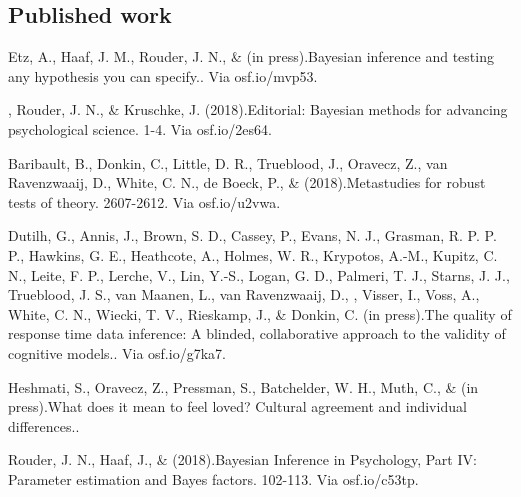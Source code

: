 

\subsection*{Published work}\srefs
\item[51.] Etz, A., Haaf, J. M., Rouder, J. N., \& \vdkh{} (in press).\newblock Bayesian inference and testing any hypothesis you can specify.. Via osf.io/mvp53.%

\item[50.] \vdkh{}, Rouder, J. N., \& Kruschke, J. (2018).\newblock Editorial: Bayesian methods for advancing psychological science. 1-4. Via osf.io/2es64.%

\item[49.] Baribault, B., Donkin, C., Little, D. R., Trueblood, J., Oravecz, Z., van Ravenzwaaij, D., White, C. N., de Boeck, P., \& \vdkh{} (2018).\newblock Metastudies for robust tests of theory. 2607-2612. Via osf.io/u2vwa.%

\item[48.] Dutilh, G., Annis, J., Brown, S. D., Cassey, P., Evans, N. J., Grasman, R. P. P. P., Hawkins, G. E., Heathcote, A., Holmes, W. R., Krypotos, A.-M., Kupitz, C. N., Leite, F. P., Lerche, V., Lin, Y.-S., Logan, G. D., Palmeri, T. J., Starns, J. J., Trueblood, J. S., van Maanen, L., van Ravenzwaaij, D., \vdkh{}, Visser, I., Voss, A., White, C. N., Wiecki, T. V., Rieskamp, J., \& Donkin, C. (in press).\newblock The quality of response time data inference: A blinded, collaborative approach 
                  to the validity of cognitive models.. Via osf.io/g7ka7.%

\item[47.] Heshmati, S., Oravecz, Z., Pressman, S., Batchelder, W. H., Muth, C., \& \vdkh{} (in press).\newblock What does it mean to feel loved? Cultural agreement and individual differences.. %

\item[46.] Rouder, J. N., Haaf, J., \& \vdkh{} (2018).\newblock Bayesian Inference in Psychology, Part IV: Parameter estimation and Bayes factors. 102-113. Via osf.io/c53tp.%

